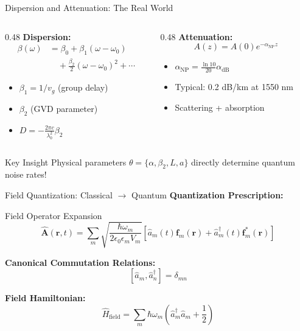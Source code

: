\documentclass[aspectratio=169,12pt]{beamer}
\begin{document}
\begin{frame}{Dispersion and Attenuation: The Real World}
\begin{columns}
\begin{column}{0.48\textwidth}
\textbf{Dispersion:}
\begin{align*}
\beta(\omega) &= \beta_0 + \beta_1(\omega - \omega_0) \\
&\quad + \frac{\beta_2}{2} (\omega - \omega_0)^2 + \cdots
\end{align*}

\begin{itemize}
\item $\beta_1 = 1/v_g$ (group delay)
\item $\beta_2$ (GVD parameter)
\item $D = -\frac{2\pi c}{\lambda_0^2} \beta_2$
\end{itemize}
\end{column}

\begin{column}{0.48\textwidth}
\textbf{Attenuation:}
$$A(z) = A(0) e^{-\alpha_{\text{NP}} z}$$

\begin{itemize}
\item $\alpha_{\text{NP}} = \frac{\ln 10}{20} \alpha_{\text{dB}}$
\item Typical: 0.2 dB/km at 1550 nm
\item Scattering + absorption
\end{itemize}
\end{column}
\end{columns}

\vspace{0.5cm}

\begin{block}{Key Insight}
Physical parameters $\theta = \{\alpha, \beta_2, L, a\}$ directly determine quantum noise rates!
\end{block}
\end{frame}

\begin{frame}{Field Quantization: Classical $\to$ Quantum}
\textbf{Quantization Prescription:}
\begin{alertblock}{Field Operator Expansion}
\begin{equation*}
\hat{\mathbf{A}}(\mathbf{r},t) = \sum_m \sqrt{\frac{\hbar\omega_m}{2\epsilon_0 \epsilon_m V_m}} \left[ \hat{a}_m(t) \mathbf{f}_m(\mathbf{r}) + \hat{a}_m^\dagger(t) \mathbf{f}_m^*(\mathbf{r}) \right]
\end{equation*}
\end{alertblock}

\vspace{0.3cm}

\textbf{Canonical Commutation Relations:}
$$[\hat{a}_m, \hat{a}_n^\dagger] = \delta_{mn}$$

\vspace{0.3cm}

\textbf{Field Hamiltonian:}
$$\hat{H}_{\text{field}} = \sum_m \hbar\omega_m \left( \hat{a}_m^\dagger \hat{a}_m + \frac{1}{2} \right)$$
\end{frame}
\end{document}
